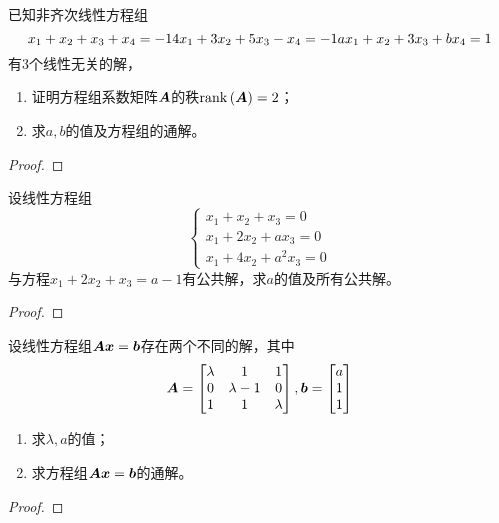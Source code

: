 \begin{problem}
已知非齐次线性方程组
\begin{equation*}
    x_1+x_2+x_3+x_4=-1\\
    4x_1+3x_2+5x_3-x_4=-1\\
    ax_1+x_2+3x_3+bx_4=1
\end{equation*}
有\(3\)个线性无关的解，
\begin{enumerate}
    \item 证明方程组系数矩阵\(\boldsymbol{A}\)的秩\(\mathrm{rank}\left( \boldsymbol{A} \right)=2\)；
    \item 求\(a,b\)的值及方程组的通解。
\end{enumerate}
\end{problem}
\begin{proof}

\end{proof}

\begin{problem}
设线性方程组
\begin{equation*}
    \begin{cases}
        x_1+x_2+x_3=0   \\
        x_1+2x_2+ax_3=0 \\
        x_1+4x_2+a^2x_3=0
    \end{cases}
\end{equation*}
与方程\(x_1+2x_2+x_3=a-1\)有公共解，求\(a\)的值及所有公共解。
\end{problem}
\begin{proof}

\end{proof}

\begin{problem}
设线性方程组\(\boldsymbol{A}\boldsymbol{x}=\boldsymbol{b}\)存在两个不同的解，其中
\begin{equation*}
    \boldsymbol{A}=
    \begin{bmatrix}
        \lambda & 1         & 1       \\
        0       & \lambda-1 & 0       \\
        1       & 1         & \lambda
    \end{bmatrix},
    \boldsymbol{b}=
    \begin{bmatrix}
        a \\1\\1
    \end{bmatrix}
\end{equation*}
\begin{enumerate}
    \item 求\(\lambda,a\)的值；
    \item 求方程组\(\boldsymbol{A}\boldsymbol{x}=\boldsymbol{b}\)的通解。
\end{enumerate}
\end{problem}
\begin{proof}

\end{proof}

